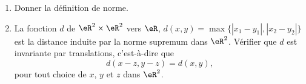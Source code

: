 \begin{exercice}\label{exoGeomAnal-0033}

  \begin{enumerate}
  \item Donner la définition de norme. 
  \item La fonction $d$ de $\eR^2\times\eR^2$ vers $\eR$,  $d(x,y)= \max \{|x_1-y_1|, |x_2-y_2|\}$ est la distance induite par la norme supremum dans $\eR^2$. Vérifier que $d$ est invariante par translations, c'est-à-dire que 
\[
d(x-z,y-z)=d(x,y), 
\]
pour tout choice de $x$, $y$ et  $z$ dans $\eR^2$.
  \end{enumerate}


\end{exercice}
